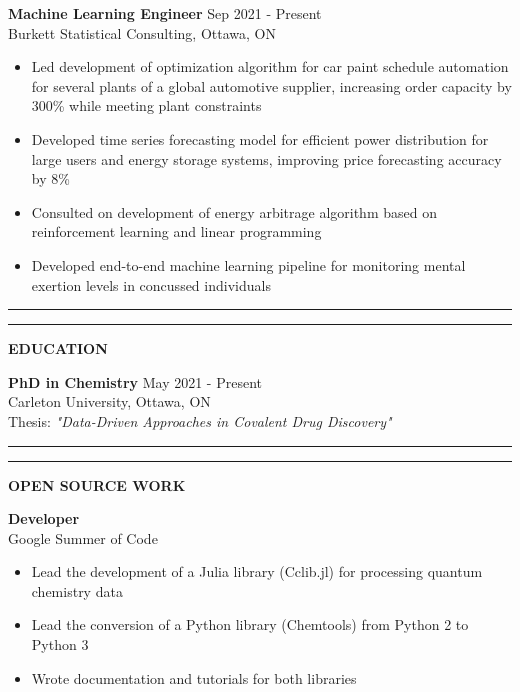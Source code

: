 \documentclass[11pt]{article}
\begin{document}
\textbf{Machine Learning Engineer} \hfill {\color{accentgray} Sep 2021 - Present}\\
{\color{accentgray} Burkett Statistical Consulting, Ottawa, ON}\\[4pt]
\begin{itemize}[itemsep=0.1pt, topsep=0pt]
    \item Led development of optimization algorithm for car paint schedule automation for several plants of a global automotive supplier, increasing order capacity by 300\% while meeting plant constraints
    \item Developed time series forecasting model for efficient power distribution for large users and energy storage systems, improving price forecasting accuracy by 8\%
    \item Consulted on development of energy arbitrage algorithm based on reinforcement learning and linear programming
    \item Developed end-to-end machine learning pipeline for monitoring mental exertion levels in concussed individuals
\end{itemize}

\vspace*{0.1in}
\noindent\rule{\textwidth}{0.1pt}

\noindent\textcolor{accentblue}{\rule{3pt}{12pt}} {\color{headinggray}\textbf{\large EDUCATION}}
\vspace*{0.1in}

\textbf{PhD in Chemistry} \hfill {\color{accentgray} May 2021 - Present}\\
{\color{accentgray} Carleton University, Ottawa, ON}\\[4pt]
Thesis: \textit{"Data-Driven Approaches in Covalent Drug Discovery"}

\vspace*{0.1in}
\noindent\rule{\textwidth}{0.1pt}

\noindent\textcolor{accentblue}{\rule{3pt}{12pt}} {\color{headinggray}\textbf{\large OPEN SOURCE WORK}}
\vspace*{0.1in}

\textbf{Developer}\\
{\color{accentgray} Google Summer of Code}\\[4pt]
\begin{itemize}[itemsep=0.1pt, topsep=0pt]
    \item Lead the development of a Julia library (Cclib.jl) for processing quantum chemistry data
    \item Lead the conversion of a Python library (Chemtools) from Python 2 to Python 3
    \item Wrote documentation and tutorials for both libraries
\end{itemize}
\end{document}

